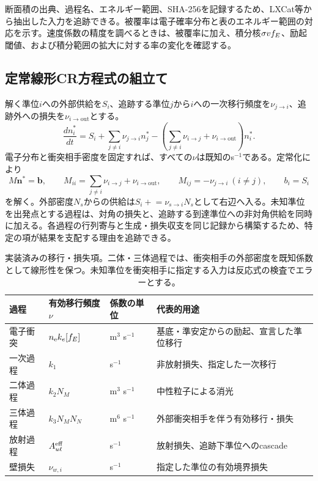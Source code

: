 断面積の出典、過程名、エネルギー範囲、SHA-256を記録するため、LXCat等から抽出した入力を追跡できる\cite{lxcat}。被覆率は電子確率分布と表のエネルギー範囲の対応を示す。速度係数の精度を調べるときは、被覆率に加え、積分核$\sigma vf_E$、励起閾値、および積分範囲の拡大に対する率の変化を確認する。

\subsection{定常線形CR方程式の組立て}
解く準位$i$への外部供給を$S_i$、追跡する準位$j$から$i$への一次移行頻度を$\nu_{j\to i}$、追跡外への損失を$\nu_{i\to\mathrm{out}}$とする。
\begin{equation}
\frac{dn_i^*}{dt}=S_i+\sum_{j\ne i}\nu_{j\to i}n_j^*
-\left(\sum_{j\ne i}\nu_{i\to j}+\nu_{i\to\mathrm{out}}\right)n_i^* .
\label{eq:balance}
\end{equation}
電子分布と衝突相手密度を固定すれば、すべての$\nu$は既知のs$^{-1}$である。定常化により
\begin{equation}
M\boldsymbol n^*=\boldsymbol b,\qquad
M_{ii}=\sum_{j\ne i}\nu_{i\to j}+\nu_{i\to\mathrm{out}},\qquad
M_{ij}=-\nu_{j\to i}\ (i\ne j),\qquad b_i=S_i
\label{eq:matrix}
\end{equation}
を解く。外部密度$N_s$からの供給は$S_i\mathrel{+}=\nu_{s\to i}N_s$として右辺へ入る。未知準位を出発点とする過程は、対角の損失と、追跡する到達準位への非対角供給を同時に加える。各過程の行列寄与と生成・損失収支を同じ記録から構築するため、特定の項が結果を支配する理由を追跡できる。

\begin{table}[htbp]
\centering\small
\begin{tabularx}{\linewidth}{p{31mm}p{38mm}p{24mm}Y}
\toprule
過程 & 有効移行頻度$\nu$ & 係数の単位 & 代表的用途 \\
\midrule
電子衝突 & $n_{\mathrm e} k_e[f_E]$ & m$^3$ s$^{-1}$ & 基底・準安定からの励起、宣言した準位移行 \\
一次過程 & $k_1$ & s$^{-1}$ & 非放射損失、指定した一次移行 \\
二体過程 & $k_2N_M$ & m$^3$ s$^{-1}$ & 中性粒子による消光 \\
三体過程 & $k_3N_MN_N$ & m$^6$ s$^{-1}$ & 外部衝突相手を伴う有効移行・損失 \\
放射過程 & $A^{\mathrm{eff}}_{u\ell}$ & s$^{-1}$ & 放射損失、追跡下準位へのcascade \\
壁損失 & $\nu_{w,i}$ & s$^{-1}$ & 指定した準位の有効境界損失 \\
\bottomrule
\end{tabularx}
\caption{実装済みの移行・損失項。二体・三体過程では、衝突相手の外部密度を既知係数として線形性を保つ。未知準位を衝突相手に指定する入力は反応式の検査でエラーとする。}
\label{tab:terms}
\end{table}

